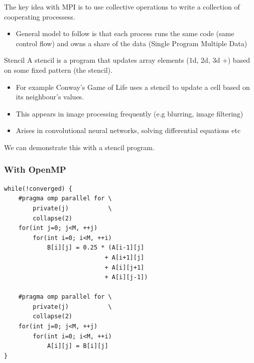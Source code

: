 The key idea with MPI is to use collective operations to write a collection of cooperating processess.
\begin{itemize}
    \item General model to follow is that each process runs the same code (same control flow) and owns a share of the data (Single Program Multiple Data)
\end{itemize}
\begin{sidenotebox}{Stencil}
    A stencil is a program that updates array elements (1d, 2d, 3d +) based on some fixed pattern (the stencil).
    \begin{itemize}
        \item For example Conway's Game of Life uses a stencil to update a cell based on its neighbour's values.
        \item This appears in image processing frequently (e.g blurring, image filtering)
        \item Arises in convolutional neural networks, solving differential equations etc
    \end{itemize}
\end{sidenotebox}
We can demonstrate this with a stencil program.
\subsubsection{With OpenMP}
\begin{verbatim}
while(!converged) {
    #pragma omp parallel for \
        private(j)           \
        collapse(2)
    for(int j=0; j<M, ++j)
        for(int i=0; i<M, ++i)
            B[i][j] = 0.25 * (A[i-1][j] 
                            + A[i+1][j] 
                            + A[i][j+1] 
                            + A[i][j-1])
    
    #pragma omp parallel for \
        private(j)           \
        collapse(2)
    for(int j=0; j<M, ++j)
        for(int i=0; i<M, ++i)
            A[i][j] = B[i][j]
}
\end{verbatim}

